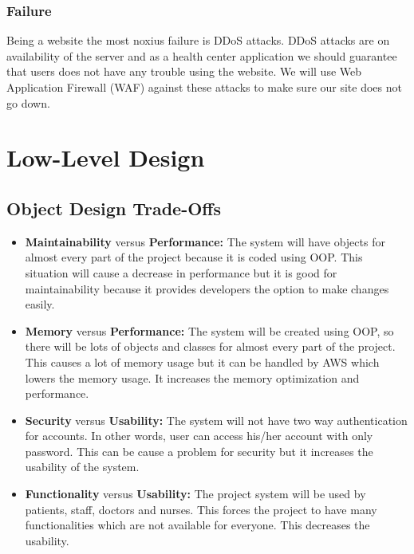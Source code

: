 \documentclass[a4paper, 12pt, titlepage]{article}
\begin{document}
  \subsubsection{Failure}

  Being a website the most noxius failure is DDoS attacks.
  DDoS attacks are on availability of the server and as a health center application we should guarantee that users does not have
  any trouble using the website.
  We will use Web Application Firewall (WAF) against these attacks to make sure our site does not go down.

  \section{Low-Level Design}

  \subsection{Object Design Trade-Offs}

  \begin{itemize}
    \item \textbf{Maintainability} versus \textbf{Performance:}
      The system will have objects for almost every part of the project because it is coded using OOP.
      This situation will cause a decrease in performance but it is good for maintainability
      because it provides developers the option to make changes easily.
    \item \textbf{Memory} versus \textbf{Performance:}
      The system will be created using OOP, so there will be lots of objects and classes
      for almost every part of the project.
      This causes a lot of memory usage but it can be handled by AWS which lowers the memory usage.
      It increases the memory optimization and performance.
    \item \textbf{Security} versus \textbf{Usability:}
      The system will not have two way authentication for accounts.
      In other words, user can access his/her account with only password.
      This can be cause a problem for security but it increases the usability of the system.
    \item \textbf{Functionality} versus \textbf{Usability:}
      The project system will be used by patients, staff, doctors and nurses.
      This forces the project to have many functionalities which are not available for everyone.
      This decreases the usability.
  \end{itemize}
\end{document}
